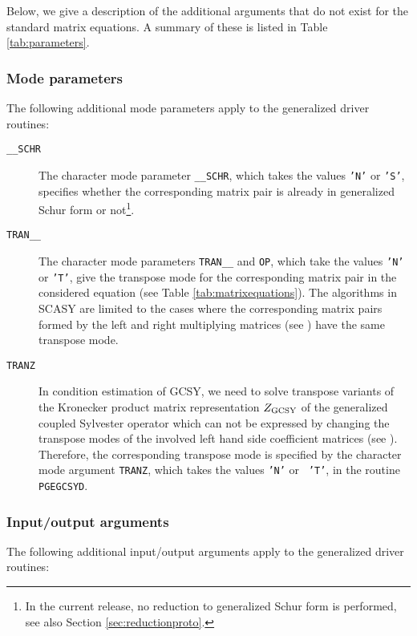 \documentclass[11pt]{article}
\begin{document}
Below, we give a description of the additional arguments that do
not exist for the standard matrix equations. A summary of these is
listed in Table \ref{tab:parameters}.

\subsubsection{Mode parameters}
\label{sec:modeparam} The following additional mode parameters
apply to the generalized driver routines:

\begin{description}
\item[\texttt{\_\_SCHR}] The character mode parameter
\texttt{\_\_SCHR}, which takes the values {\tt 'N'} or {\tt 'S'},
specifies whether the corresponding matrix pair is already in
generalized Schur form or not\footnote{In the current release, no
reduction to generalized Schur form is performed, see also Section
\ref{sec:reductionproto}.}.

\item[\texttt{TRAN\_\_}] The character mode parameters
\texttt{TRAN\_\_} and \texttt{OP}, which take the values {\tt 'N'}
or {\tt 'T'}, give the transpose mode for the corresponding matrix
pair in the considered equation (see Table
\ref{tab:matrixequations}). The algorithms in SCASY are limited to
the cases where the corresponding matrix pairs formed by the left
and right multiplying matrices (see
\cite{granatkagstrom09a,granatkagstrom09b}) have the same
transpose mode.

\item[\texttt{TRANZ}] In condition estimation of GCSY, we need to
solve transpose variants of the Kronecker product matrix
representation $Z_{\rm GCSY}$ of the generalized coupled Sylvester
operator which can not be expressed by changing the transpose
modes of the involved left hand side coefficient matrices (see
\cite{granatkagstrom09a,granatkagstrom09b}). Therefore, the
corresponding transpose mode is specified by the character mode
argument \texttt{TRANZ}, which takes the values {\tt 'N'} or {\tt
'T'}, in the routine \texttt{PGEGCSYD}.
\end{description}

\subsubsection{Input/output arguments}
The following additional input/output arguments apply to the
generalized driver routines:
\end{document}
